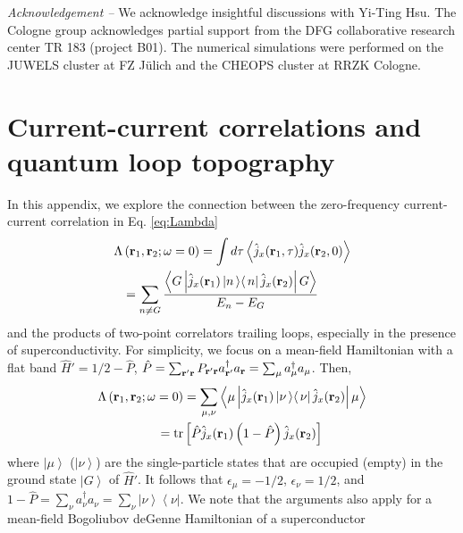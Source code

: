 \documentclass[amsmath,amssymb, aps, prl, twocolumn]{revtex4-1}
\begin{document}

{\it Acknowledgement --} We acknowledge insightful discussions with Yi-Ting Hsu. The Cologne group acknowledges partial support
from the DFG collaborative research center TR 183 (project B01). The numerical simulations were performed on the JUWELS cluster 
at FZ J\"ulich and the CHEOPS cluster at RRZK Cologne.




\newpage
\appendix

\section{Current-current correlations and quantum loop topography}

In this appendix, we explore the connection between the zero-frequency current-current correlation in Eq. \ref{eq:Lambda}
\begin{equation}
\left. \begin{aligned}
\Lambda&\left({\bf r}_1, {\bf r}_2;\omega=0\right) = \int d\tau \left\langle \hat{j}_x({\bf r}_1,\tau)\hat{j}_x({\bf r}_2,0) \right\rangle  \\
&=\sum_{n\ne G} \frac{\left\langle G \left| \hat{j}_x({\bf r}_1)  \left|n\left\rangle  \right\langle n\right| \hat{j}_x({\bf r}_2)\right| G\right\rangle}{E_n-E_G} 
\end{aligned}
\right.
\end{equation}
and the products of two-point correlators trailing loops, especially in the presence of superconductivity. For simplicity, we focus on a mean-field Hamiltonian with a flat band $\hat{H}'=1/2-\hat P$, $\hat P=\sum_{{\bf r}'{\bf r}}P_{{\bf r}'{\bf r}}a^\dagger_{{\bf r}'} a_{\bf r}=\sum_{\mu}a^\dagger_\mu a_\mu$. Then, 
\begin{equation}
\left. \begin{aligned}
\Lambda\left({\bf r}_1, {\bf r}_2;\omega=0\right)&
=\sum_{\mu, \nu}\left\langle \mu \left| \hat{j}_x({\bf r}_1)  \left|\nu\left\rangle  \right\langle \nu\right|\hat{j}_x({\bf r}_2)\right| \mu\right\rangle \\
= \mbox{tr}&\left[\hat{P} \hat{j}_x({\bf r}_1) \left(1-\hat{P}\right) \hat{j}_x({\bf r}_2)\right]
\end{aligned}
\right.
\label{eq:app1}
\end{equation}
where $\left|\mu\right\rangle$ ($\left|\nu\right\rangle$) are the single-particle states that are occupied (empty) in the ground state $\left|G\right\rangle$ of $\hat{H}'$. It follows that $\epsilon_\mu=-1/2$, $\epsilon_\nu=1/2$, and $1-\hat P=\sum_{\nu}a^\dagger_\nu a_\nu=\sum_{\nu}\left|\nu\right\rangle\left\langle\nu\right|$. We note that the arguments also apply for a mean-field Bogoliubov deGenne Hamiltonian of a superconductor
\end{document}
